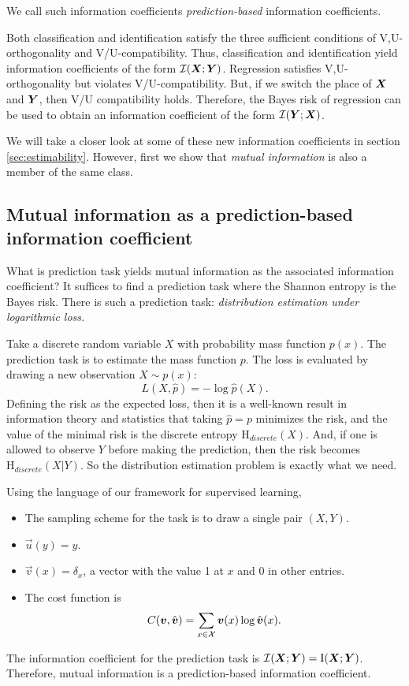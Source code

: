 \documentclass[12pt]{article}
\begin{document}
We call such information coefficients \emph{prediction-based}
information coefficients.

Both classification and identification satisfy the three sufficient
conditions of V,U-orthogonality and V/U-compatibility.  Thus,
classification and identification yield information coefficients of
the form $\mathcal{I}(\boldsymbol{X}; \boldsymbol{Y})$.  Regression satisfies
V,U-orthogonality but violates V/U-compatibility. But, if we switch
the place of $\boldsymbol{X}$ and $\boldsymbol{Y}$, then V/U compatibility holds.
Therefore, the Bayes risk of regression can be used to obtain an
information coefficient of the form $\mathcal{I}(\boldsymbol{Y}; \boldsymbol{X})$.

We will take a closer look at some of these new information
coefficients in section \ref{sec:estimability}.  
However, first we show that \emph{mutual information} is also a member of the same class.

\subsection{Mutual information as a prediction-based information coefficient}

What is prediction task yields mutual information as the associated
information coefficient?  It suffices to find a prediction task where
the Shannon entropy is the Bayes risk.  There is such a prediction
task: \emph{distribution estimation under logarithmic loss.}

Take a discrete random variable $X$ with probability mass function $p(x)$.
The prediction task is to estimate the mass function $p$.
The loss is evaluated by drawing a new observation $X \sim p(x)$:
\[
L(X, \hat{p}) = -\log \hat{p}(X).
\]
Defining the risk as the expected loss, then it is a well-known result
in information theory and statistics that taking $\hat{p} = p$
minimizes the risk, and the value of the minimal risk is the discrete
entropy $\text{H}_{discrete}(X)$. And, if one is allowed to observe
$Y$ before making the prediction, then the risk becomes
$\text{H}_{discrete}(X|Y)$.  So the distribution estimation problem is
exactly what we need.

Using the language of our framework for supervised learning,
\begin{itemize}
\item The sampling scheme for the task is to draw a single pair $(X, Y)$.
\item $\vec{u}(y) = y$.
\item $\vec{v}(x) = \delta_x$, a vector with the value 1 at $x$ and 0 in other entries.
\item The cost function is
\[
C(\boldsymbol{v}, \hat{\boldsymbol{v}}) = \sum_{x \in \mathcal{X}} \boldsymbol{v}(x) \log \hat{\boldsymbol{v}}(x).
\]
\end{itemize}
The information coefficient for the prediction task is $\mathcal{I}(\boldsymbol{X}; \boldsymbol{Y}) = \text{I}(\boldsymbol{X}; \boldsymbol{Y})$.
Therefore, mutual information is a prediction-based information coefficient.
\end{document}
